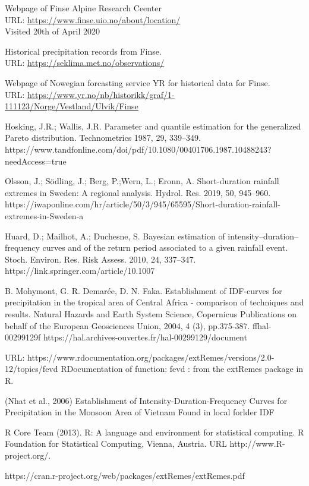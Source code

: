 \begin{thebibliography}{9}
Webpage of Finse Alpine Research Ceenter\\
URL: \url{https://www.finse.uio.no/about/location/}\\
Visited 20th of April 2020

Historical precipitation records from Finse.\\
URL: \url{https://seklima.met.no/observations/}

Webpage of Nowegian forcasting service YR for historical data for Finse.\\
URL: \url{https://www.yr.no/nb/historikk/graf/1-111123/Norge/Vestland/Ulvik/Finse}

Hosking, J.R.; Wallis, J.R. Parameter and quantile estimation for the generalized Pareto distribution.
Technometrics 1987, 29, 339–349.
https://www.tandfonline.com/doi/pdf/10.1080/00401706.1987.10488243?needAccess=true

Olsson, J.; Södling, J.; Berg, P.;Wern, L.; Eronn, A. Short-duration rainfall extremes in Sweden: A regional
analysis. Hydrol. Res. 2019, 50, 945–960.
https://iwaponline.com/hr/article/50/3/945/65595/Short-duration-rainfall-extremes-in-Sweden-a

Huard, D.; Mailhot, A.; Duchesne, S. Bayesian estimation of intensity–duration–frequency curves and of
the return period associated to a given rainfall event. Stoch. Environ. Res. Risk Assess. 2010, 24, 337–347.
https://link.springer.com/article/10.1007%

B. Mohymont, G. R. Demarée, D. N. Faka. Establishment of IDF-curves for precipitation in the
tropical area of Central Africa - comparison of techniques and results. Natural Hazards and Earth
System Science, Copernicus Publications on behalf of the European Geosciences Union, 2004, 4 (3),
pp.375-387. ffhal-00299129f
https://hal.archives-ouvertes.fr/hal-00299129/document

URL: https://www.rdocumentation.org/packages/extRemes/versions/2.0-12/topics/fevd
RDocumentation of function: fevd : from the extRemes package in R.

(Nhat et al., 2006)
Establishment of Intensity-Duration-Frequency Curves
for Precipitation in the Monsoon Area of Vietnam
Found in local forlder IDF

R Core Team (2013). R: A language and environment for statistical
computing. R Foundation for Statistical Computing, Vienna, Austria.
URL http://www.R-project.org/.

https://cran.r-project.org/web/packages/extRemes/extRemes.pdf


\end{thebibliography} 